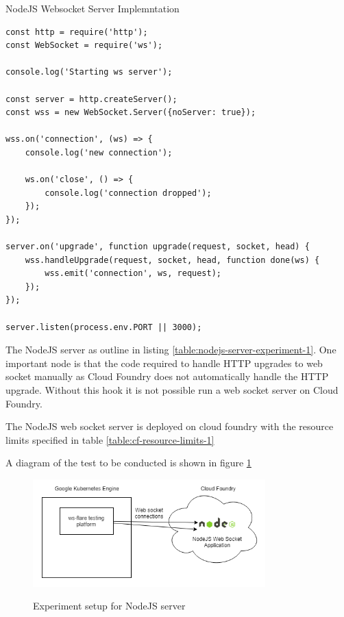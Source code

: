 \begin{listing}[H]
    \caption{NodeJS Websocket Server Implemntation}
    \label{table:nodejs-server-experiment-1}
    \begin{verbatim}
const http = require('http');
const WebSocket = require('ws');

console.log('Starting ws server');

const server = http.createServer();
const wss = new WebSocket.Server({noServer: true});

wss.on('connection', (ws) => {
    console.log('new connection');

    ws.on('close', () => {
        console.log('connection dropped');
    });
});

server.on('upgrade', function upgrade(request, socket, head) {
    wss.handleUpgrade(request, socket, head, function done(ws) {
        wss.emit('connection', ws, request);
    });
});

server.listen(process.env.PORT || 3000);
\end{verbatim}
\end{listing}

The NodeJS server as outline in listing \ref{table:nodejs-server-experiment-1}. One important node is that the code required to handle HTTP upgrades to web socket manually as Cloud Foundry does not automatically handle the HTTP upgrade. Without this hook it is not possible run a web socket server on Cloud Foundry. 

The NodeJS web socket server is deployed on cloud foundry with the resource limits specified in table \ref{table:cf-resource-limits-1}

\begin{table}[H]
\caption{Cloud Foundry Resource Limits}
\label{table:cf-resource-limits-1}
\end{table}

A diagram of the test to be conducted is shown in figure \ref{fig:experiment-1-vis-nodejs}

\begin{figure}[H]
  \centering
  \caption{Experiment setup for NodeJS server}
    \includegraphics[width=0.8\textwidth]{figures/experiments/experiment-vis-nodejs.png}
    \label{fig:experiment-1-vis-nodejs}
\end{figure}


